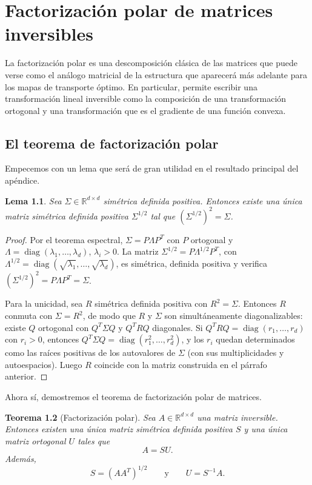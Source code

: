 \documentclass[12pt, a4paper]{amsbook}
\newcommand{\R}{{\mathbb R}}
\newtheorem{teo}{Teorema}[section]
\newtheorem{lema}[teo]{Lema}
\theoremstyle{remark}
\theoremstyle{definition}
\numberwithin{section}{chapter}
\numberwithin{subsection}{section}
\numberwithin{equation}{section}
\numberwithin{figure}{chapter}
\begin{document}
\chapter{Factorización polar de matrices inversibles}\label{ap.FP}

La factorización polar es una descomposición clásica de las matrices que
puede verse como el análogo matricial de la estructura que aparecerá más
adelante para los mapas de transporte óptimo. En particular, permite
escribir una transformación lineal inversible como la composición de una
transformación ortogonal y una transformación que es el gradiente de una
función convexa.

\section{El teorema de factorización polar}

Empecemos con un lema que será de gran utilidad en el resultado principal del apéndice.
\begin{lema}\label{lema.raiz.cuadrada}
Sea $\Sigma\in\R^{d\times d}$ simétrica definida positiva. Entonces existe una
única matriz simétrica definida positiva $\Sigma^{1/2}$ tal que
$(\Sigma^{1/2})^2=\Sigma$.
\end{lema}

\begin{proof}
Por el teorema espectral, $\Sigma=P\Lambda P^T$ con $P$ ortogonal y
$\Lambda=\operatorname{diag}(\lambda_1,\dots,\lambda_d)$, $\lambda_i>0$.
La matriz $\Sigma^{1/2}=P\Lambda^{1/2}P^T$, con
$\Lambda^{1/2}=\operatorname{diag}(\sqrt{\lambda_1},\dots,\sqrt{\lambda_d})$,
es simétrica, definida positiva y verifica $(\Sigma^{1/2})^2=P\Lambda P^T=\Sigma$.

Para la unicidad, sea $R$ simétrica definida positiva con $R^2=\Sigma$.
Entonces $R$ conmuta con $\Sigma=R^2$, de modo que $R$ y $\Sigma$ son
simultáneamente diagonalizables: existe $Q$ ortogonal con $Q^T\Sigma Q$ y
$Q^TRQ$ diagonales. Si $Q^TRQ=\operatorname{diag}(r_1,\dots,r_d)$ con $r_i>0$,
entonces $Q^T\Sigma Q=\operatorname{diag}(r_1^2,\dots,r_d^2)$, y los $r_i$ quedan
determinados como las raíces positivas de los autovalores de $\Sigma$ (con
sus multiplicidades y autoespacios). Luego $R$ coincide con la matriz
construida en el párrafo anterior.
\end{proof}


Ahora sí, demostremos el teorema de factorización polar de matrices.
\begin{teo}[Factorización polar]\label{teo.FP.lineal}
Sea $A\in\mathbb R^{d\times d}$ una matriz inversible. Entonces existen
una única matriz simétrica definida positiva $S$ y una única matriz
ortogonal $U$ tales que
\[
A=SU.
\]
Además,
\[
S=(AA^T)^{1/2}
\qquad\text{y}\qquad
U=S^{-1}A.
\]
\end{teo}
\end{document}
